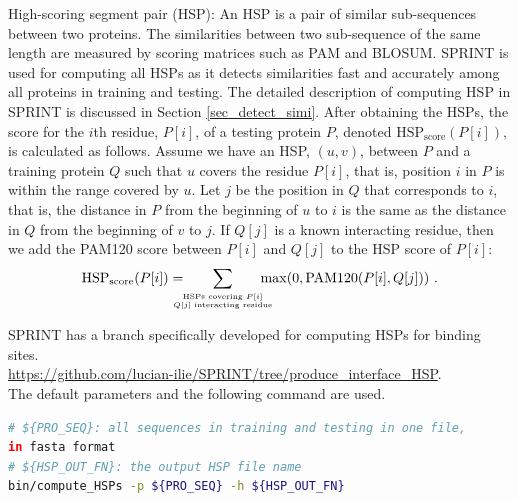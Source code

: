 High-scoring segment pair (HSP): An HSP is a pair of similar sub-sequences between two proteins. The similarities between two sub-sequence of the same length are measured by scoring matrices such as PAM and BLOSUM. SPRINT \cite{li2017sprint} is used for computing all HSPs as it detects similarities fast and accurately among all proteins in training and testing. The detailed description of computing HSP in SPRINT is discussed in Section \ref{sec_detect_simi}. After obtaining the HSPs, the score for the $i$th residue, $P[i]$, of a testing protein $P$, denoted $\text{HSP}_{\text{score}}(P[i])$, is calculated as follows. Assume we have an HSP, $(u,v)$, between $P$ and a training protein $Q$ such that $u$ covers the residue $P[i]$, that is, position $i$ in $P$ is within the range covered by $u$. Let $j$ be the position in $Q$ that corresponds to $i$, that is, the distance in $P$ from the beginning of $u$ to $i$ is the same as the distance in $Q$ from the beginning of $v$ to $j$. If $Q[j]$ is a known interacting residue, then we add the PAM120 score between $P[i]$ and $Q[j]$ to the HSP score of $P[i]$:
\[
\text{HSP}_{\text{score}}(P[i]) = \!\!\!\!\!\!\sum_{\stackrel{\text{\tiny HSPs covering $P[i]$}}{\text{\tiny $Q[j]$ interacting residue}}}\!\!\!\!\!\! \max(0, \text{PAM120}(P[i], Q[j])) \ .
\]

SPRINT has a branch specifically developed for computing HSPs for binding sites.\\ \href{https://github.com/lucian-ilie/SPRINT/tree/produce_interface_HSP}{https://github.com/lucian-ilie/SPRINT/tree/produce\_interface\_HSP}.\\ The default parameters and the following command are used.
\begin{lstlisting}[language=bash,frame=single]
# ${PRO_SEQ}: all sequences in training and testing in one file, 
in fasta format
# ${HSP_OUT_FN}: the output HSP file name
bin/compute_HSPs -p ${PRO_SEQ} -h ${HSP_OUT_FN} 
\end{lstlisting}

